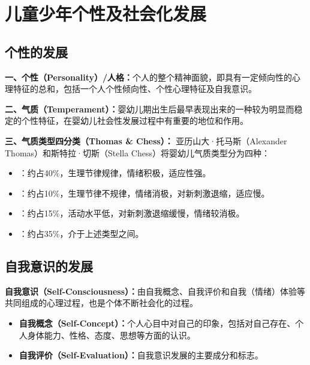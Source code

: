 \section{儿童少年个性及社会化发展}

\subsection{个性的发展}

\begin{defbox}
\textbf{一、个性（Personality）/人格：}个人的整个精神面貌，即具有一定倾向性的心理特征的总和，包括一个人个性倾向性、个性心理特征及自我意识。

\textbf{二、气质（Temperament）：}婴幼儿期出生后最早表现出来的一种较为明显而稳定的个性特征，在婴幼儿社会性发展过程中有重要的地位和作用。

\textbf{三、气质类型四分类（Thomas \& Chess）：}
亚历山大·托马斯（Alexander Thomas）和斯特拉·切斯（Stella Chess）将婴幼儿气质类型分为四种：
\begin{itemize}[leftmargin=*]
    \item {}：约占40\%，生理节律规律，情绪积极，适应性强。
    \item {}：约占10\%，生理节律不规律，情绪消极，对新刺激退缩，适应慢。
    \item {}：约占15\%，活动水平低，对新刺激退缩缓慢，情绪较消极。
    \item {}：约占35\%，介于上述类型之间。
\end{itemize}
\end{defbox}

\subsection{自我意识的发展}

\begin{defbox}
\textbf{自我意识（Self-Consciousness）：}由自我概念、自我评价和自我（情绪）体验等共同组成的心理过程，也是个体不断社会化的过程。

\begin{itemize}[leftmargin=*]
    \item \textbf{自我概念（Self-Concept）：}个人心目中对自己的印象，包括对自己存在、个人身体能力、性格、态度、思想等方面的认识。
    \item \textbf{自我评价（Self-Evaluation）：}自我意识发展的主要成分和标志。
\end{itemize}
\end{defbox}

